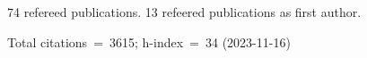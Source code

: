 74 refereed publications. 13 refeered publications as first author.

Total citations~=~3615; h-index~=~34 (2023-11-16)